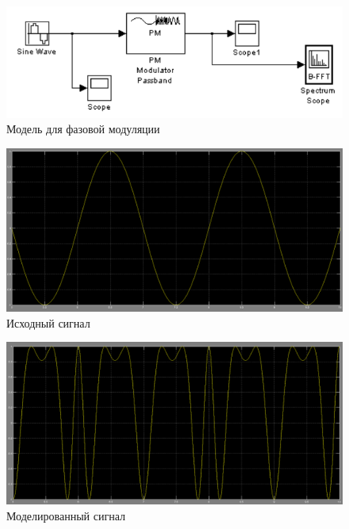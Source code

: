 \begin{figure}[H]

\includegraphics[width=150mm, scale = 0.9]{lab8/8_7}
   \caption{Модель для фазовой модуляции}

\end{figure}
\begin{figure}[H]

\includegraphics[width=150mm, scale = 0.9]{lab8/8_8}
   \caption{Исходный сигнал}

\end{figure}
\begin{figure}[H]

\includegraphics[width=150mm, scale = 0.9]{lab8/8_9}
   \caption{Моделированный сигнал}

\end{figure}
